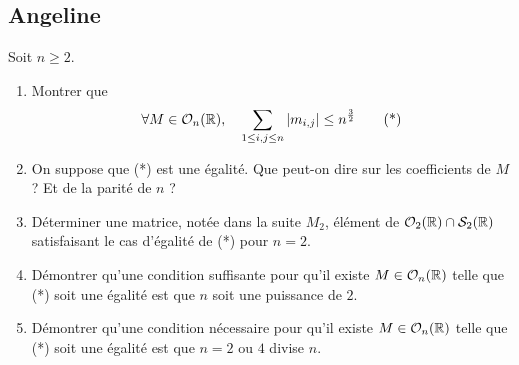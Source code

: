 \begin{sol}
	[À rédiger]
\end{sol}

\subsection{Angeline}
\begin{exo}
	Soit $n\geq 2$.
	\begin{enumerate}
		\item Montrer que \[\forall M\in\mathcal O_n(\mathbb{R}),\quad \sum_{1\leq i,j\leq n}|m_{i,j}|\leq n^{\frac32}\tag{*}\]
		\item On suppose que (*) est une égalité. Que peut-on dire sur les coefficients de $M$ ? Et de la parité de $n$ ?
		\item Déterminer une matrice, notée dans la suite $M_2$, élément de $\mathcal O_2(\mathbb{R})\cap\mathcal S_2(\mathbb{R})$ satisfaisant le cas d'égalité de (*) pour $n = 2$.
		\item Démontrer qu'une condition suffisante pour qu'il existe $M\in\mathcal O_n(\mathbb{R})$ telle que (*) soit une égalité est que $n$ soit une puissance de $2$.
		\item Démontrer qu'une condition nécessaire pour qu'il existe $M\in\mathcal O_n(\mathbb{R})$ telle que (*) soit une égalité est que $n=2$ ou $4$ divise $n$.
	\end{enumerate}
\end{exo}

\begin{sol}
	[À rédiger]
\end{sol}